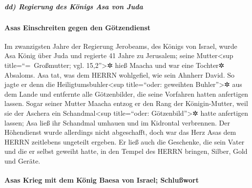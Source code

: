 \hypertarget{dd-regierung-des-kuxf6nigs-asa-von-juda}{%
\subparagraph{dd) Regierung des Königs Asa von
Juda}\label{dd-regierung-des-kuxf6nigs-asa-von-juda}}

\hypertarget{asas-einschreiten-gegen-den-guxf6tzendienst}{%
\paragraph{Asas Einschreiten gegen den
Götzendienst}\label{asas-einschreiten-gegen-den-guxf6tzendienst}}

Im zwanzigsten Jahre der Regierung Jerobeams, des Königs
von Israel, wurde Asa König über Juda und regierte 41
Jahre zu Jerusalem; seine Mutter\textless sup title=``=~Großmutter; vgl.
15,2''\textgreater✲ hieß Maacha und war eine Tochter✲ Absaloms.
Asa tat, was dem HERRN wohlgefiel, wie sein Ahnherr
David. So jagte er denn die Heiligtumsbuhler\textless sup
title=``oder: geweihten Buhler''\textgreater✲ aus dem Lande und
entfernte alle Götzenbilder, die seine Vorfahren hatten anfertigen
lassen. Sogar seiner Mutter Maacha entzog er den Rang der
Königin-Mutter, weil sie der Aschera ein Schandmal\textless sup
title=``oder: Götzenbild''\textgreater✲ hatte anfertigen lassen; Asa
ließ ihr Schandmal umhauen und im Kidrontal verbrennen.
Der Höhendienst wurde allerdings nicht abgeschafft, doch
war das Herz Asas dem HERRN zeitlebens ungeteilt ergeben.
Er ließ auch die Geschenke, die sein Vater und die er
selbst geweiht hatte, in den Tempel des HERRN bringen, Silber, Gold und
Geräte.

\hypertarget{asas-krieg-mit-dem-kuxf6nig-baesa-von-israel-schluuxdfwort}{%
\paragraph{Asas Krieg mit dem König Baesa von Israel;
Schlußwort}\label{asas-krieg-mit-dem-kuxf6nig-baesa-von-israel-schluuxdfwort}}

